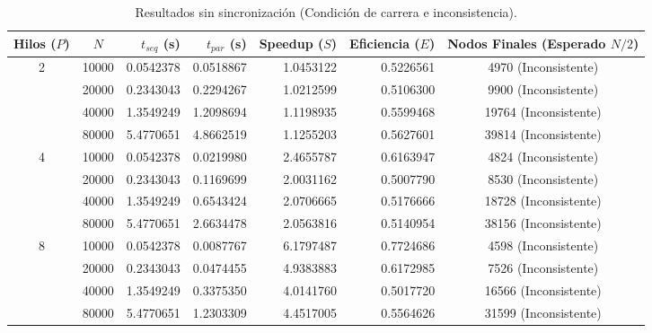 \documentclass[11pt,a4paper]{article}
\begin{document}
\begin{table}[htbp]
\centering
\caption{Resultados sin sincronización (Condición de carrera e inconsistencia).}
\label{tab:resultados_lista_nosync}
\small
\begin{tabular}{ccrrrrc}
\toprule
\textbf{Hilos ($P$)} & \textbf{$N$} & \textbf{$t_{seq}$ (s)} & \textbf{$t_{par}$ (s)} & \textbf{Speedup ($S$)} & \textbf{Eficiencia ($E$)} & \textbf{Nodos Finales (Esperado $N/2$)} \\
\midrule
\multirow{4}{*}{2} 
 & 10000 & 0.0542378 & 0.0518867 & 1.0453122 & 0.5226561 & 4970 (Inconsistente) \\
 & 20000 & 0.2343043 & 0.2294267 & 1.0212599 & 0.5106300 & 9900 (Inconsistente) \\
 & 40000 & 1.3549249 & 1.2098694 & 1.1198935 & 0.5599468 & 19764 (Inconsistente) \\
 & 80000 & 5.4770651 & 4.8662519 & 1.1255203 & 0.5627601 & 39814 (Inconsistente) \\
\midrule
\multirow{4}{*}{4} 
 & 10000 & 0.0542378 & 0.0219980 & 2.4655787 & 0.6163947 & 4824 (Inconsistente) \\
 & 20000 & 0.2343043 & 0.1169699 & 2.0031162 & 0.5007790 & 8530 (Inconsistente) \\
 & 40000 & 1.3549249 & 0.6543424 & 2.0706665 & 0.5176666 & 18728 (Inconsistente) \\
 & 80000 & 5.4770651 & 2.6634478 & 2.0563816 & 0.5140954 & 38156 (Inconsistente) \\
\midrule
\multirow{4}{*}{8} 
 & 10000 & 0.0542378 & 0.0087767 & 6.1797487 & 0.7724686 & 4598 (Inconsistente) \\
 & 20000 & 0.2343043 & 0.0474455 & 4.9383883 & 0.6172985 & 7526 (Inconsistente) \\
 & 40000 & 1.3549249 & 0.3375350 & 4.0141760 & 0.5017720 & 16566 (Inconsistente) \\
 & 80000 & 5.4770651 & 1.2303309 & 4.4517005 & 0.5564626 & 31599 (Inconsistente) \\
\bottomrule
\end{tabular}
\end{table}
\end{document}
